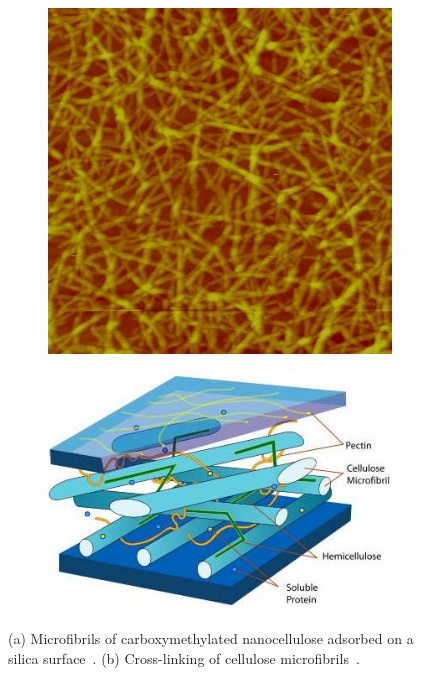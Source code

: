 \begin{figure}
\centering

\begin{subfigure}{.49\linewidth}
  \centering
  \includegraphics[width=.8\linewidth]{img/AFM_Innventia_nanocellulose}
  \caption{}
  \label{fig:cellulose}
\end{subfigure}
\begin{subfigure}{.49\linewidth}
  \centering
  \includegraphics[width=\linewidth]{img/crosslink}
  \caption{}
  \label{fig:crosslink}
\end{subfigure}%
\caption{(a) Microfibrils of carboxymethylated nanocellulose adsorbed on a silica surface~\cite{xxx}. (b) Cross-linking of cellulose microfibrils~\cite{xxx}.}
\end{figure}







